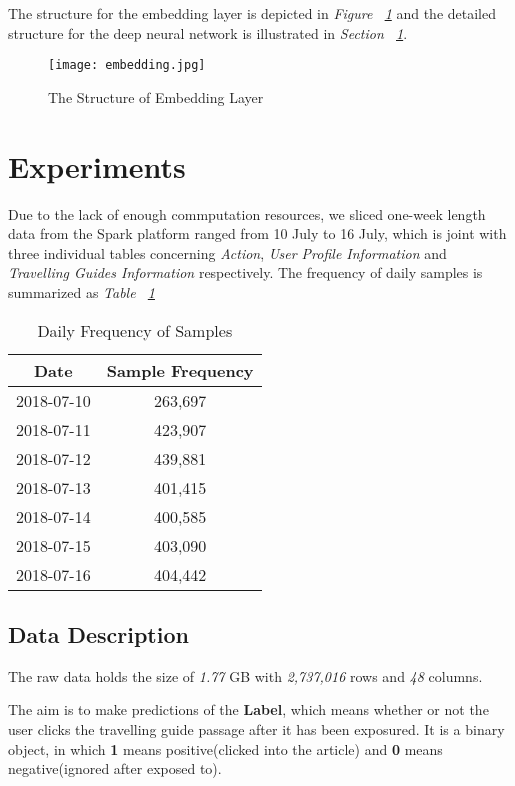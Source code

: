 \documentclass{article}
\begin{document}
    The structure for the embedding layer is depicted in \emph{Figure ~\ref{fig:embedding}} and the detailed structure for the deep neural network is illustrated in \emph{Section ~\ref{sec:exper}}.

    \begin{figure}[!h]
		\centering
		\texttt{[image: embedding.jpg]}
		\caption{\small{The Structure of Embedding Layer~\cite{guo17:deepfm}}}
		\label{fig:embedding}
	\end{figure}

    \newpage
    \section{Experiments}
	\label{sec:exper}
    Due to the lack of enough commputation resources, we sliced one-week length data from the Spark platform ranged from 10 July to 16 July, which is joint with three individual tables concerning \emph{Action}, \emph{User Profile Information} and \emph{Travelling Guides Information} respectively. The frequency of daily samples is summarized as \emph{Table ~\ref{ta:frequency}}

    \begin{table}[!h]
		\centering
		\small{
		    \caption{Daily Frequency of Samples}
			\begin{tabular}{cc}
				\toprule
				\textbf{Date}  & \textbf{Sample Frequency}\\ 
				\midrule
				2018-07-10	&263,697 \\
                2018-07-11	&423,907 \\
                2018-07-12	&439,881 \\
				2018-07-13	&401,415 \\
				2018-07-14	&400,585 \\
				2018-07-15	&403,090 \\
				2018-07-16	&404,442 \\
			\bottomrule 
			\end{tabular}
			
			\label{ta:frequency}
		}
	\end{table}

	\subsection{Data Description}
    The raw data holds the size of \emph{1.77} GB with \emph{2,737,016} rows and \emph{48} columns. 

    The aim is to make predictions of the \textbf{Label}, which means whether or not the user clicks the travelling guide passage after it has been exposured. It is a binary object, in which \textbf{1} means positive(clicked into the article) and \textbf{0} means negative(ignored after exposed to). 
\end{document}
